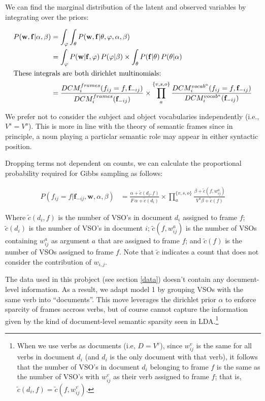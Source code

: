\documentclass{article} %
\renewcommand\phi\varphi
\begin{document}
We can find the marginal distribution of the latent and observed variables by
integrating over the priors:

\begin{align*}
 P(\mathbf{w},\mathbf{f}|\alpha,\beta)
&=\int_\phi\int_\theta P(\mathbf{w},\mathbf{f}|\theta,\phi,\alpha,\beta)\\
&=     \int_\phi P(\mathbf{w}|\mathbf{f},\phi )\,P(\phi|\beta)
\times \int_\theta P(\mathbf{f}|\theta)\,P(\theta|\alpha)\\
\intertext{These integrals are both dirichlet multinomials:}
&=\frac{DCM_i^{frames}(f_{ij}=f, \mathbf{f}_{-ij})}{DCM_i^{frames}(\mathbf{f}_{-ij})}\times
\prod_a^{\{v,s,o\}}\frac{DCM_i^{vocab^a}(f_{ij}=f, \mathbf{f}_{-ij})}{DCM_i^{vocab^a}(\mathbf{f}_{-ij})}
\end{align*}

We prefer not to consider the subject and object vocabularies independently 
(i.e., $V^s = V^o$). This is more in line with the theory of semantic frames 
since in principle, a noun playing a particlar semantic role may appear in either 
syntactic position.

Dropping terms not dependent on counts, we can calculate the proportional
probability required for Gibbs sampling as follows:

\begin{align}
P(f_{ij} = f|\mathbf{f}_{-ij},\mathbf{w}, \alpha,\beta)
&=\frac{\alpha + \tilde c(d_i,f)}{F\,\alpha + \tilde c(d_i)}
\times \prod_a^{\{v,s,o\}}\frac{\beta+\tilde c(f,w_{ij}^a)}{V^a\beta+\tilde c(f)}
\end{align}

Where $\tilde c (d_i, f)$ is the number of VSO's in document $d_i$ assigned to frame $f$;
$\tilde c(d_i)$ is the number of VSO's in document $i$;
$\tilde c(f,w_{ij}^a)$ is the number of VSOs containing $w_{ij}^a$ as argument $a$ that are
assigned to frame $f$; and
$\tilde c(f)$ is the number of VSOs assigned to frame $f$.
Note that $\tilde c$ indicates a count that does not consider the contribution of 
$w_{i,j}$.

The data used in this probject (see section \ref{data}) doesn't contain any document-level
information. As a result, we adapt model 1 by grouping VSOs with the same verb into ``documents''.
This move leverages the dirichlet prior $\alpha$ to enforce sparcity of frames 
accross verbs, but of course cannot capture the information given by the kind of
document-level semantic sparsity seen in LDA.\footnote{When we use verbs as
documents (i.e, $D = V^v$), since $w_{ij}^v$ is the same for all verbs in document $d_i$ 
(and $d_i$ is the only document with that verb), it follows that the number of VSO's in document 
$d_i$ belonging to frame $f$ is the same as the number of VSO's with $w_{ij}^v$ as their verb assigned to 
frame $f$; that is, $\tilde c(d_i, f) = \tilde c(f, w_{ij}^v)$.}
\end{document}
